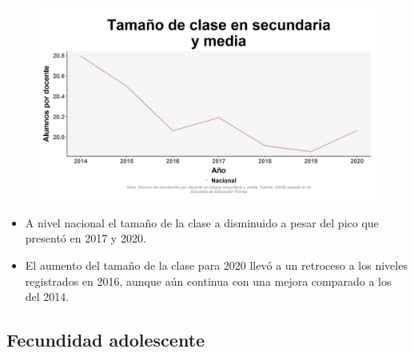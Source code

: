     \begin{figure}[H]
        \caption[Tamaño de clase en secundaria y media a nivel nacional ]{\label{temano_sec_nal_trend} }
        \begin{center}
        \includegraphics[width=\textwidth,keepaspectratio]{img/var_231_trend.png}
        \end{center}
    \end{figure}
            \begin{itemize}
                \item A nivel nacional el tamaño de la clase a disminuido a pesar del pico que presentó en 2017 y 2020.
                \item El aumento del tamaño de la clase para 2020 llevó a un retroceso a los niveles registrados en 2016, aunque aún continua con una mejora comparado a los del 2014.
                \end{itemize}

    \subsection{Fecundidad adolescente}

